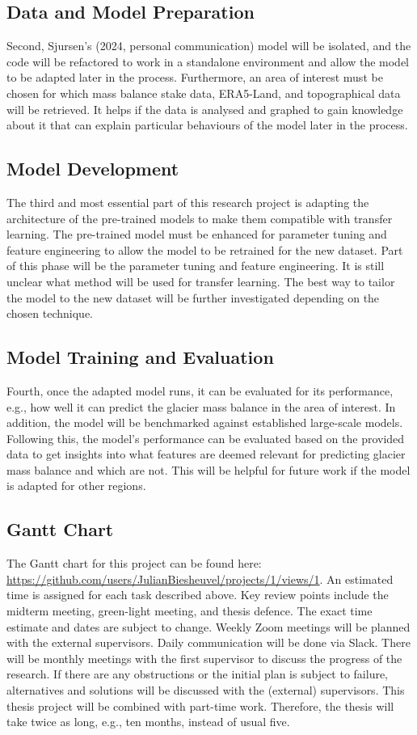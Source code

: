 \subsection{Data and Model Preparation}
Second, Sjursen's (2024, personal communication) model will be isolated, and the code will be refactored to work in a standalone environment and allow the model to be adapted later in the process. Furthermore, an area of interest must be chosen for which mass balance stake data, ERA5-Land, and topographical data will be retrieved. It helps if the data is analysed and graphed to gain knowledge about it that can explain particular behaviours of the model later in the process. 

\subsection{Model Development}
The third and most essential part of this research project is adapting the architecture of the pre-trained models to make them compatible with transfer learning. The pre-trained model must be enhanced for parameter tuning and feature engineering to allow the model to be retrained for the new dataset. Part of this phase will be the parameter tuning and feature engineering. It is still unclear what method will be used for transfer learning. The best way to tailor the model to the new dataset will be further investigated depending on the chosen technique. 

\subsection{Model Training and Evaluation}
Fourth, once the adapted model runs, it can be evaluated for its performance, e.g., how well it can predict the glacier mass balance in the area of interest. In addition, the model will be benchmarked against established large-scale models. Following this, the model's performance can be evaluated based on the provided data to get insights into what features are deemed relevant for predicting glacier mass balance and which are not. This will be helpful for future work if the model is adapted for other regions.

\subsection{Gantt Chart}
The Gantt chart for this project can be found here: \url{https://github.com/users/JulianBiesheuvel/projects/1/views/1}. An estimated time is assigned for each task described above. Key review points include the midterm meeting, green-light meeting, and thesis defence. The exact time estimate and dates are subject to change. Weekly Zoom meetings will be planned with the external supervisors. Daily communication will be done via Slack. There will be monthly meetings with the first supervisor to discuss the progress of the research. If there are any obstructions or the initial plan is subject to failure, alternatives and solutions will be discussed with the (external) supervisors. This thesis project will be combined with part-time work. Therefore, the thesis will take twice as long, e.g., ten months, instead of usual five.